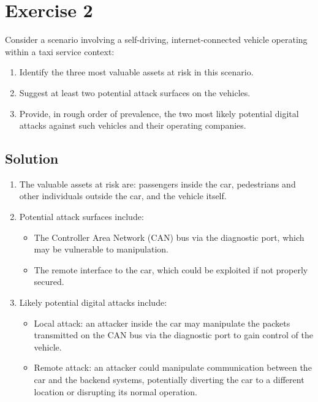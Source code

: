 \section{Exercise 2}

Consider a scenario involving a self-driving, internet-connected vehicle operating within a taxi service context:
\begin{enumerate}
    \item Identify the three most valuable assets at risk in this scenario.
    \item Suggest at least two potential attack surfaces on the vehicles.
    \item Provide, in rough order of prevalence, the two most likely potential digital attacks against such vehicles and their operating companies.
\end{enumerate}

\subsection*{Solution}
\begin{enumerate}
    \item The valuable assets at risk are: passengers inside the car, pedestrians and other individuals outside the car, and the vehicle itself.
    \item Potential attack surfaces include:
        \begin{itemize}
            \item The Controller Area Network (CAN) bus via the diagnostic port, which may be vulnerable to manipulation.
            \item The remote interface to the car, which could be exploited if not properly secured.
        \end{itemize}
    \item Likely potential digital attacks include:
    \begin{itemize}
        \item Local attack: an attacker inside the car may manipulate the packets transmitted on the CAN bus via the diagnostic port to gain control of the vehicle.
        \item Remote attack: an attacker could manipulate communication between the car and the backend systems, potentially diverting the car to a different location or disrupting its normal operation.
        \end{itemize}
\end{enumerate}